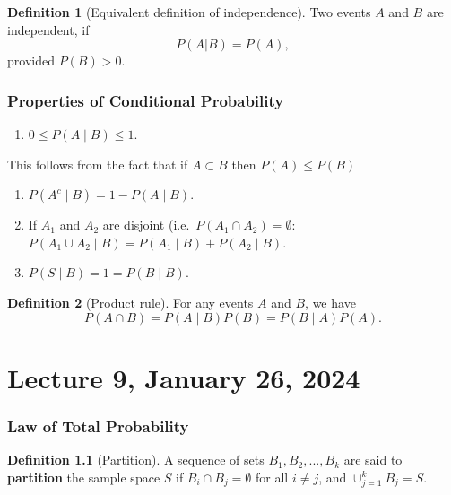 \documentclass[
]{book}
\providecommand{\tightlist}{%
  \setlength{\itemsep}{0pt}\setlength{\parskip}{0pt}}
\theoremstyle{definition}
\newtheorem{definition}{Definition}[chapter]
\theoremstyle{definition}
\theoremstyle{definition}
\theoremstyle{definition}
\theoremstyle{remark}
\begin{document}
\begin{definition}[Equivalent definition of independence]
Two events \(A\) and \(B\) are independent, if
\[
P(A|B)=P(A),
\]
provided \(P(B)>0\).
\end{definition}

\hypertarget{properties-of-conditional-probability}{%
\subsection{Properties of Conditional Probability}\label{properties-of-conditional-probability}}

\begin{enumerate}
\def\labelenumi{\arabic{enumi}.}
\tightlist
\item
  \(0 \le P(A \mid B) \le 1\).
\end{enumerate}

This follows from the fact that if \(A \subset B\) then \(P(A) \le P(B)\)

\begin{enumerate}
\def\labelenumi{\arabic{enumi}.}
\setcounter{enumi}{1}
\item
  \(P(A^c \mid B) = 1-P(A \mid B)\).
\item
  If \(A_1\) and \(A_2\) are disjoint (i.e.~\(P(A_1\cap A_2)=\emptyset\): \(P(A_1 \cup A_2 \mid B) = P(A_1 \mid B) + P(A_2 \mid B)\).
\item
  \(P(S \mid B)= 1 = P(B \mid B)\).
\end{enumerate}

\begin{definition}[Product rule]
For any events \(A\) and \(B\), we have
\[
P(A\cap B) = P(A\mid B) P(B)  = P(B \mid A) P(A).
\]
\end{definition}

\hypertarget{lecture-9-january-26-2024}{%
\chapter{Lecture 9, January 26, 2024}\label{lecture-9-january-26-2024}}

\hypertarget{law-of-total-probability}{%
\subsection{Law of Total Probability}\label{law-of-total-probability}}

\begin{definition}[Partition]
A sequence of sets \(B_1,B_2,...,B_k\) are said to \textbf{partition} the sample space \(S\) if \(B_i \cap B_j = \emptyset\) for all \(i \ne j\), and \(\cup_{j=1}^k B_j = S\).
\end{definition}
\end{document}
